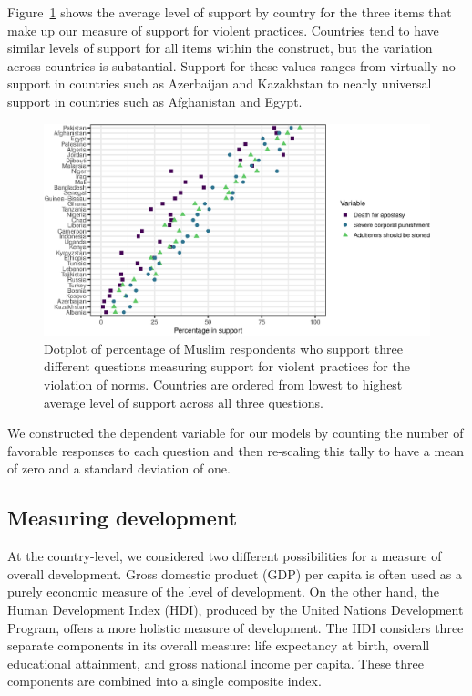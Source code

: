 \documentclass[10pt,letterpaper]{article}
\begin{document}
Figure~\ref{fig2} shows the average level of support by country for the three
items that make up our measure of support for violent practices.
Countries tend to have similar levels of support for all items within
the construct, but the variation across countries is substantial.
Support for these values ranges from virtually no support in countries
such as Azerbaijan and Kazakhstan to nearly universal support in
countries such as Afghanistan and Egypt.

\begin{figure}[!h]
\begin{adjustwidth}{-2.25in}{0in}
\centering
\includegraphics{figures/fig2.eps}
\caption{Dotplot of percentage of Muslim respondents who support three
different questions measuring support for violent practices for the
violation of norms. Countries are ordered from lowest to highest average
level of support across all three questions.}
\label{fig2}
\end{adjustwidth}
\end{figure}

We constructed the dependent variable for our models by counting the
number of favorable responses to each question and then re-scaling this
tally to have a mean of zero and a standard deviation of one.

\subsection*{Measuring development}

At the country-level, we considered two different possibilities for a
measure of overall development. Gross domestic product (GDP) per capita
is often used as a purely economic measure of the level of development.
On the other hand, the Human Development Index (HDI), produced by the
United Nations Development Program, offers a more holistic measure of
development. The HDI considers three separate components in its overall
measure: life expectancy at birth, overall educational attainment, and
gross national income per capita. These three components are combined
into a single composite index.
\end{document}
